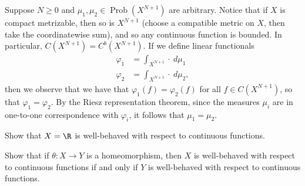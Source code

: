 \documentclass[10pt]{mypackage}
\begin{document}
\begin{solution}
  Suppose $N\geq 0$ and $\mu_1,\mu_2\in \operatorname{Prob}\left( X^{N+1} \right)$ are arbitrary. Notice that if $X$ is compact metrizable, then so is $X^{N+1}$ (choose a compatible metric on $X$, then take the coordinatewise sum), and so any continuous function is bounded. In particular, $C\left( X^{N+1} \right) = C^b\left( X^{N+1} \right)$. If we define linear functionals
  \begin{align*}
    \varphi_1 &= \int_{X^{N+1}}^{} \cdot\:d\mu_1\\
    \varphi_2 &= \int_{X^{N+1}}^{} \cdot\:d\mu_2,
  \end{align*}
  then we observe that we have that $\varphi_1(f) = \varphi_2(f)$ for all $f\in C\left( X^{N+1} \right)$, so that $\varphi_1 = \varphi_2$. By the Riesz representation theorem, since the measures $\mu_i$ are in one-to-one correspondence with $\varphi_i$, it follows that $\mu_1 = \mu_2$.
\end{solution}
\begin{problem}[Problem IV.3]
  Show that $X = \R$ is well-behaved with respect to continuous functions.
\end{problem}
\begin{solution}
  
\end{solution}
\begin{problem}[Problem IV.4]
  Show that if $\theta\colon X\to Y$ is a homeomorphism, then $X$ is well-behaved with respect to continuous functions if and only if $Y$ is well-behaved with respect to continuous functions.
\end{problem}
\end{document}
